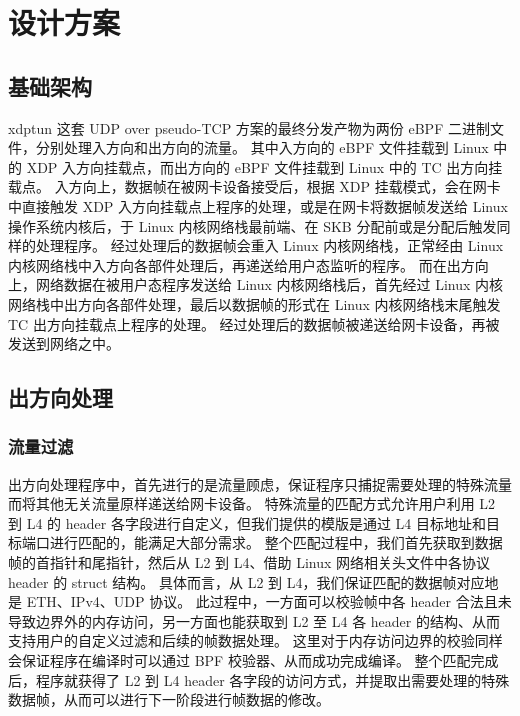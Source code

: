 

\chapter{设计方案}

\section{基础架构}

xdptun 这套 UDP over pseudo-TCP 方案的最终分发产物为两份 eBPF 二进制文件，分别处理入方向和出方向的流量。
其中入方向的 eBPF 文件挂载到 Linux 中的 XDP 入方向挂载点，而出方向的 eBPF 文件挂载到 Linux 中的 TC 出方向挂载点。
入方向上，数据帧在被网卡设备接受后，根据 XDP 挂载模式，会在网卡中直接触发 XDP 入方向挂载点上程序的处理，或是在网卡将数据帧发送给 Linux 操作系统内核后，于 Linux 内核网络栈最前端、在 SKB 分配前或是分配后触发同样的处理程序。
经过处理后的数据帧会重入 Linux 内核网络栈，正常经由 Linux 内核网络栈中入方向各部件处理后，再递送给用户态监听的程序。
而在出方向上，网络数据在被用户态程序发送给 Linux 内核网络栈后，首先经过 Linux 内核网络栈中出方向各部件处理，最后以数据帧的形式在 Linux 内核网络栈末尾触发 TC 出方向挂载点上程序的处理。
经过处理后的数据帧被递送给网卡设备，再被发送到网络之中。

\section{出方向处理}

\subsection{流量过滤}

出方向处理程序中，首先进行的是流量顾虑，保证程序只捕捉需要处理的特殊流量而将其他无关流量原样递送给网卡设备。
特殊流量的匹配方式允许用户利用 L2 到 L4 的 header 各字段进行自定义，但我们提供的模版是通过 L4 目标地址和目标端口进行匹配的，能满足大部分需求。
整个匹配过程中，我们首先获取到数据帧的首指针和尾指针，然后从 L2 到 L4、借助 Linux 网络相关头文件中各协议 header 的 struct 结构。
具体而言，从 L2 到 L4，我们保证匹配的数据帧对应地是 ETH、IPv4、UDP 协议。
此过程中，一方面可以校验帧中各 header 合法且未导致边界外的内存访问，另一方面也能获取到 L2 至 L4 各 header 的结构、从而支持用户的自定义过滤和后续的帧数据处理。
这里对于内存访问边界的校验同样会保证程序在编译时可以通过 BPF 校验器、从而成功完成编译。
整个匹配完成后，程序就获得了 L2 到 L4 header 各字段的访问方式，并提取出需要处理的特殊数据帧，从而可以进行下一阶段进行帧数据的修改。

